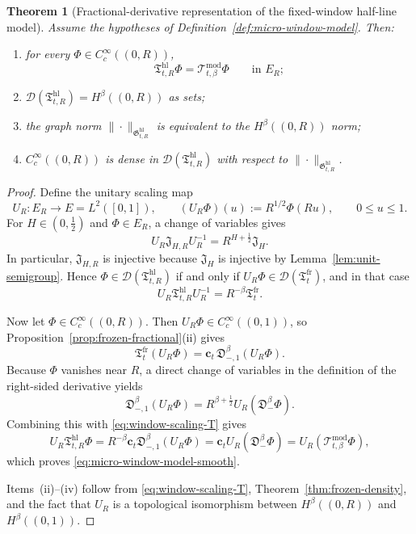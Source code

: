 \documentclass[11pt,a4paper]{amsart}
\theoremstyle{plain}
\newtheorem{theorem}{Theorem}[section]
\theoremstyle{definition}
\theoremstyle{remark}
\begin{document}
\begin{theorem}[Fractional-derivative representation of the fixed-window half-line model]
\label{thm:micro-window-model}
Assume the hypotheses of Definition~\ref{def:micro-window-model}. Then:
\begin{enumerate}[label=(\roman*)]
\item for every \(\Phi\in C_c^\infty((0,R))\),
\begin{equation}\label{eq:micro-window-model-smooth}
\mathfrak T_{t,R}^{\mathrm{hl}}\Phi
=
\mathcal T_{t,\beta}^{\mathrm{mod}}\Phi
\qquad\text{in }E_R;
\end{equation}
\item \(\mathcal D(\mathfrak T_{t,R}^{\mathrm{hl}})=H^\beta((0,R))\) as sets;
\item the graph norm \(\|\cdot\|_{\mathfrak G_{t,R}^{\mathrm{hl}}}\) is equivalent to the
\(H^\beta((0,R))\) norm;
\item \(C_c^\infty((0,R))\) is dense in \(\mathcal D(\mathfrak T_{t,R}^{\mathrm{hl}})\) with
respect to \(\|\cdot\|_{\mathfrak G_{t,R}^{\mathrm{hl}}}\).
\end{enumerate}
\end{theorem}

\begin{proof}
Define the unitary scaling map
\[
U_R:E_R\to E=L^2([0,1]),
\qquad
(U_R\Phi)(u):=R^{1/2}\Phi(Ru),
\qquad 0\le u\le 1.
\]
For \(H\in(0,\tfrac12)\) and \(\Phi\in E_R\), a change of variables gives
\begin{equation}\label{eq:window-scaling-J}
U_R\mathfrak J_{H,R}U_R^{-1}
=
R^{H+\frac12}\mathfrak J_H.
\end{equation}
In particular, \(\mathfrak J_{H,R}\) is injective because \(\mathfrak J_H\) is injective by
Lemma~\ref{lem:unit-semigroup}.
Hence \(\Phi\in\mathcal D(\mathfrak T_{t,R}^{\mathrm{hl}})\) if and only if \(U_R\Phi\in
\mathcal D(\mathfrak T_t^{\mathrm{fr}})\), and in that case
\begin{equation}\label{eq:window-scaling-T}
U_R\mathfrak T_{t,R}^{\mathrm{hl}}U_R^{-1}
=
R^{-\beta}\mathfrak T_t^{\mathrm{fr}}.
\end{equation}

Now let \(\Phi\in C_c^\infty((0,R))\). Then \(U_R\Phi\in C_c^\infty((0,1))\), so
Proposition~\ref{prop:frozen-fractional}(ii) gives
\[
\mathfrak T_t^{\mathrm{fr}}(U_R\Phi)
=
\mathbf c_t\,\mathfrak D_{-,1}^{\beta}(U_R\Phi).
\]
Because \(\Phi\) vanishes near \(R\), a direct change of variables in the definition of the
right-sided derivative yields
\[
\mathfrak D_{-,1}^{\beta}(U_R\Phi)
=
R^{\beta+\frac12}U_R(\mathfrak D_-^\beta \Phi).
\]
Combining this with \eqref{eq:window-scaling-T} gives
\[
U_R\mathfrak T_{t,R}^{\mathrm{hl}}\Phi
=
R^{-\beta}\mathbf c_t \mathfrak D_{-,1}^{\beta}(U_R\Phi)
=
\mathbf c_t U_R(\mathfrak D_-^\beta\Phi)
=
U_R(\mathcal T_{t,\beta}^{\mathrm{mod}}\Phi),
\]
which proves \eqref{eq:micro-window-model-smooth}.

Items~(ii)--(iv) follow from \eqref{eq:window-scaling-T}, Theorem~\ref{thm:frozen-density}, and the
fact that \(U_R\) is a topological isomorphism between \(H^\beta((0,R))\) and \(H^\beta((0,1))\).
\end{proof}
\end{document}

